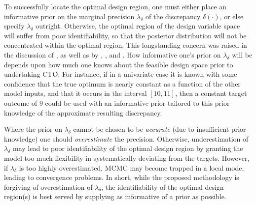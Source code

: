 \documentclass[12pt]{article}
\begin{document}
%
To successfully locate the optimal design region, one must either place an informative prior on the marginal precision $\lambda_\delta$ of the discrepancy $\delta(\cdot)$, or else specify $\lambda_\delta$ outright. 
%
Otherwise, the optimal region of the design variable space will suffer from poor identifiability, so that the posterior distribution will not be concentrated within the optimal region.
%
This longstanding concern was raised in the discussion of \cite{Kennedy2001}, as well as by \cite{Bayarri2007}, \cite{Tuo2015}, and \cite{Plumlee2017}.
%
How informative one's prior on $\lambda_\delta$ will be depends upon how much one knows about the feasible design space prior to undertaking CTO.
%
For instance, if in a univariate case it is known with some confidence that the true optimum is nearly constant as a function of the other model inputs, and that it occurs in the interval $[10,11]$, then a constant target outcome of $9$ could be used with an informative prior tailored to this prior knowledge of the approximate resulting discrepancy.
%

Where the prior on $\lambda_\delta$ cannot be chosen to be \emph{accurate} (due to insufficient prior knowledge) one should \emph{overestimate} the precision.
%
Otherwise, underestimation of $\lambda_\delta$ may lead to poor identifiability of the optimal design region by granting the model too much flexibility in systematically deviating from the targets.
%
%
%
%
%
%
However, if $\lambda_\delta$ is too highly overestimated, MCMC may become trapped in a local mode, leading to convergence problems. 
%
In short, while the proposed methodology is forgiving of overestimation of $\lambda_\delta$, the identifiability of the optimal design region(s) is best served by supplying as informative of a prior as possible. 
\end{document}
